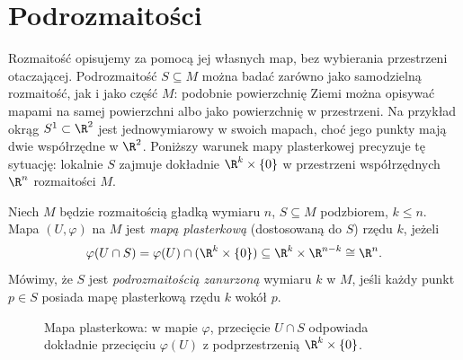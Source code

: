 \section{Podrozmaitości}

Rozmaitość opisujemy za pomocą jej własnych map, bez wybierania
przestrzeni otaczającej. Podrozmaitość $S\subseteq M$ można badać
zarówno jako samodzielną rozmaitość, jak i jako część $M$:
podobnie powierzchnię Ziemi można opisywać mapami na samej powierzchni
albo jako powierzchnię w przestrzeni. Na przykład okrąg
$S^1\subset\R^2$ jest jednowymiarowy w swoich mapach, choć jego
punkty mają dwie współrzędne w $\R^2$. Poniższy warunek mapy
plasterkowej precyzuje tę sytuację: lokalnie $S$ zajmuje dokładnie
$\R^k\times\{0\}$ w przestrzeni współrzędnych $\R^n$ rozmaitości $M$.

\begin{definicja}
Niech $M$ będzie rozmaitością gładką wymiaru $n$, $S\subseteq M$ podzbiorem, $k\leq n$.
Mapa $(U,\varphi)$ na $M$ jest \emph{mapą plasterkową} (dostosowaną do $S$) rzędu $k$,
jeżeli
\[
\varphi(U\cap S)=\varphi(U)\cap(\R^k\times\{0\})\subseteq\R^k\times\R^{n-k}\cong\R^n.
\]
Mówimy, że $S$ jest \emph{podrozmaitością zanurzoną} wymiaru $k$ w $M$, jeśli każdy punkt
$p\in S$ posiada mapę plasterkową rzędu $k$ wokół $p$.
\end{definicja}

\begin{figure}[h]
\centering
{}
\caption{Mapa plasterkowa: w mapie $\varphi$, przecięcie $U\cap S$ odpowiada dokładnie
przecięciu $\varphi(U)$ z podprzestrzenią $\R^k\times\{0\}$.}
\label{fig:plasterek}
\end{figure}

